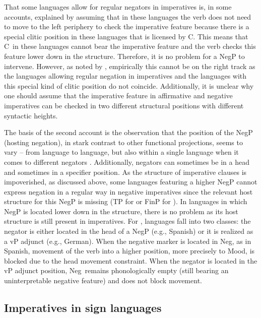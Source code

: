 That some languages allow for regular negators in imperatives is, in some accounts, explained by assuming that in these languages the verb does not need to move to the left periphery to check the imperative feature because there is a special clitic position in these languages that is licensed by C\textdegree . This means that C\textdegree\ in these languages cannot bear the imperative feature and the verb checks this feature lower down in the structure. Therefore, it is no problem for a NegP to intervene. However, as noted by \citet[62]{van2007imperatives}, empirically this cannot be on the right track as the languages allowing regular negation in imperatives and the languages with this special kind of clitic position do not coincide. Additionally, it is unclear why one should assume that the imperative feature in affirmative and negative imperatives can be checked in two different structural positions with different syntactic heights.

The basis of the second account is the observation that the position of the NegP (hosting negation), in stark contrast to other functional projections, seems to vary -- from language to language, but also within a single language when it comes to different negators \citep{ouhalla1990sentential, ouhalla1991functional, zanuttini1991syntactic}. Additionally, negators can sometimes be in a head and sometimes in a specifier position. As the structure of imperative clauses is impoverished, as discussed above, some languages featuring a higher NegP cannot express negation in a regular way in negative imperatives since the relevant host structure for this NegP is missing (TP for \citealt{zanuttini1991syntactic} or FinP for \citealt{platzack1998subject}). In languages in which NegP is located lower down in the structure, there is no problem as its host structure is still present in imperatives. For \citet{zeijlstra2004sentential}, languages fall into two classes: the negator is either located in the head of a NegP (e.g., Spanish) or it is realized as a vP adjunct (e.g., German). When the negative marker is located in Neg\textdegree , as in Spanish, movement of the verb into a higher position, more precisely to Mood\textdegree , is blocked due to the head movement constraint. When the negator is located in the vP adjunct position, Neg\textdegree\ remains phonologically empty (still bearing an uninterpretable negative feature) and does not block movement.

\subsection{Imperatives in sign languages}

